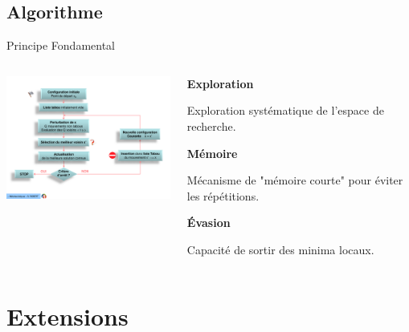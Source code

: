 \documentclass[10pt, handout]{beamer}
\begin{document}
\subsection{Algorithme}
\begin{frame}{Principe Fondamental}

    \begin{columns}[T] %
        \begin{column}{0.6\textwidth}
            \raggedright
            \includegraphics[width=7cm]{Docs_RT1.pdf}
        \end{column}

        \begin{column}{0.4\textwidth}

            \textbf{Exploration}
            \medskip

            Exploration systématique de l'espace de recherche. \medskip

            \textbf{Mémoire}
            \medskip

            Mécanisme de "mémoire courte" pour éviter les répétitions. \medskip

            \textbf{Évasion}
            \medskip

            Capacité de sortir des minima locaux.

        \end{column}
    \end{columns}
\end{frame}

\section{Extensions}
\end{document}
